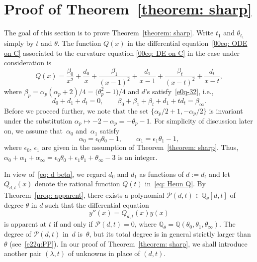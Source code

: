 \documentclass[pdftex]{sigma}
\numberwithin{equation}{section}
\def\Q{\mathbb Q}
\begin{document}
\section{Proof of Theorem~\ref{theorem: sharp}}
\label{section: proof of Theorem 1.4}

The goal of this section is to prove Theorem~\ref{theorem: sharp}.
Write $t_1$ and $\theta_{t_1}$ simply by $t$ and $\theta$.
The function $Q(x)$ in the differential
equation~\eqref{00eq: ODE on C} associated to the curvature equation
\eqref{00eq: DE on C} in the case under consideration is
\begin{equation} \label{eq: Heun Q}
Q(x)=\frac{\beta_0}{x^2}+\frac{d_0}x
+\frac{\beta_1}{(x-1)^2}+\frac{d_1}{x-1}
+\frac{\beta_t}{(x-t)^2}+\frac{d_t}{x-t},
\end{equation}
where $\beta_p=\alpha_p(\alpha_p+2)/4=\bigl(\theta_p^2-1\bigr)/4$ and $d$'s
satisfy~\eqref{e0q-32}, i.e.,
\begin{equation} \label{eq: d beta}
d_0+d_1+d_t=0, \qquad
\beta_0+\beta_1+\beta_t+d_1+td_t=\beta_\infty.
\end{equation}
Before we proceed further, we note that the set
$\{\alpha_p/2+1,-\alpha_p/2\}$ is invariant under the substitution
$\alpha_p\mapsto-2-\alpha_p=-\theta_p-1$. For simplicity of discussion later on,
we assume that~$\alpha_0$ and~$\alpha_1$ satisfy
\begin{equation} \label{eq: choice of alpha}
\alpha_0=\epsilon_0\theta_0-1, \qquad
\alpha_1=\epsilon_1\theta_1-1,
\end{equation}
where $\epsilon_0$, $\epsilon_1$ are given in the assumption of Theorem~\ref{theorem: sharp}. Thus, $\alpha_0+\alpha_1+\alpha_\infty=\epsilon_0\theta_0
+\epsilon_1\theta_1+\theta_\infty-3$ is an integer.

In view of~\eqref{eq: d beta}, we regard $d_0$ and $d_1$ as
functions of $d:=d_t$ and let $Q_{d,t}(x)$ denote the rational function
$Q(t)$ in~\eqref{eq: Heun Q}. By Theorem~\ref{prop: apparent}, there
exists a polynomial $\mathcal P(d,t)\in\Q_{\theta}[d,t]$ of degree
$\theta$ in $d$ such that the differential equation
\begin{equation} \label{eq: Heun equation}
 y''(x)=Q_{d,t}(x)y(x)
\end{equation}
is apparent at $t$ if and only if $\mathcal P(d,t)=0$, where
$\Q_{\theta}=\Q(\theta_0,\theta_1,\theta_\infty)$. The degree of
$\mathcal P(d,t)$ in~$d$ is~$\theta$, but its total degree is in
general strictly larger than $\theta$ (see~\eqref{e22q:PP}).
In our proof of Theorem~\ref{theorem: sharp}, we shall introduce
another pair $(\lambda,t)$ of unknowns in place of $(d,t)$.
\end{document}
